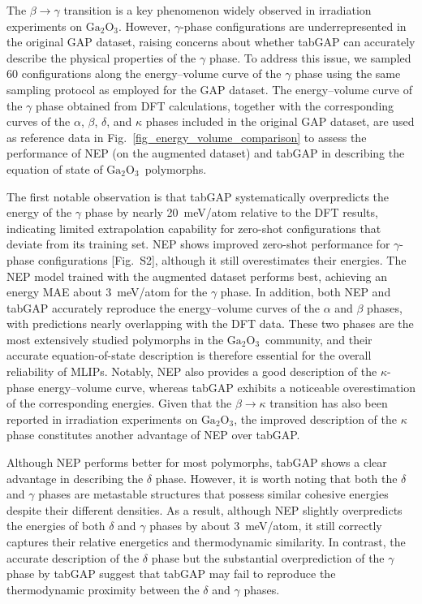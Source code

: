 \documentclass[aip,graphicx,amsmath,amssymb]{revtex4-1}
\newcommand{\ga}{$\text{Ga}_2\text{O}_3$}
\begin{document}
The $\beta \to \gamma$ transition is a key phenomenon widely observed in irradiation
experiments on \ga.\cite{zhao_crystallization_2025,han_electronic_2025,abdullaev_ions_2025} 
However, $\gamma$-phase configurations are underrepresented in the original GAP dataset,
raising concerns about whether tabGAP can accurately describe the physical properties of
the $\gamma$ phase.
To address this issue, we sampled 60 configurations along the energy--volume curve of the
$\gamma$ phase using the same sampling protocol as employed for the GAP dataset.
The energy--volume curve of the $\gamma$ phase obtained from DFT calculations, together
with the corresponding curves of the $\alpha$, $\beta$, $\delta$, and $\kappa$ phases
included in the original GAP dataset, are used as reference data in
Fig.~\ref{fig_energy_volume_comparison} to assess the performance of NEP (on the augmented dataset) 
and tabGAP in describing the equation of state of \ga\ polymorphs.

The first notable observation is that tabGAP systematically overpredicts the energy of
the $\gamma$ phase by nearly 20~meV/atom relative to the DFT results, indicating limited
extrapolation capability for zero-shot configurations that deviate from its training set.
NEP shows improved zero-shot performance for $\gamma$-phase configurations
[Fig.~S2], although it still overestimates their energies.
The NEP model trained with the augmented dataset performs best, achieving an energy MAE
about 3~meV/atom for the $\gamma$ phase.
In addition, both NEP and tabGAP accurately reproduce the energy--volume curves of the
$\alpha$ and $\beta$ phases, with predictions nearly overlapping with the DFT data.
These two phases are the most extensively studied polymorphs in the \ga\ community, and
their accurate equation-of-state description is therefore essential for the overall
reliability of MLIPs.
Notably, NEP also provides a good description of the $\kappa$-phase energy--volume curve,
whereas tabGAP exhibits a noticeable overestimation of the corresponding energies.
Given that the $\beta \to \kappa$ transition has also been reported in irradiation
experiments on \ga,\cite{han_electronic_2025} the improved description of the $\kappa$
phase constitutes another advantage of NEP over tabGAP.

Although NEP performs better for most polymorphs, tabGAP shows a clear advantage in
describing the $\delta$ phase.
However, it is worth noting that both the $\delta$ and $\gamma$ phases are 
metastable structures that possess similar cohesive energies despite their different densities.
As a result, although NEP slightly overpredicts the energies of both $\delta$ and $\gamma$
phases by about 3~meV/atom, it still correctly captures their relative energetics and
thermodynamic similarity.
In contrast, the accurate description of the $\delta$ phase but the substantial
overprediction of the $\gamma$ phase by tabGAP suggest that tabGAP may fail to reproduce
the thermodynamic proximity between the $\delta$ and $\gamma$ phases.
\end{document}
